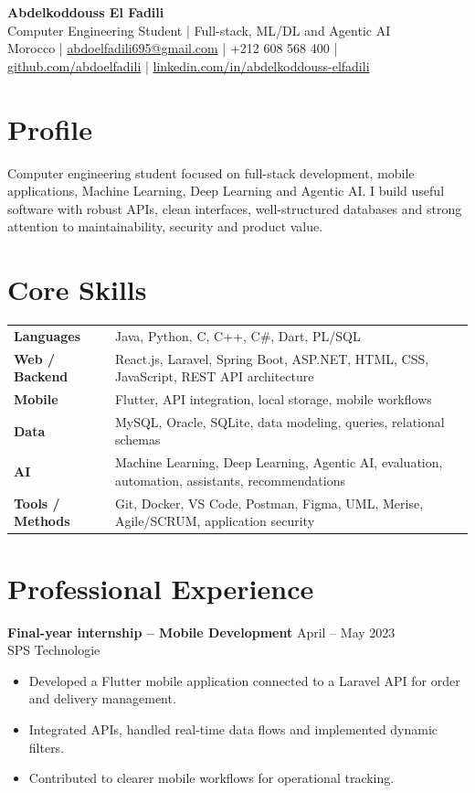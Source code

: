\documentclass[10pt,a4paper]{article}
\newcommand{\entry}[4]{
  \textbf{#1} \hfill {\small\color{muted} #2}\\
  {\color{accent}#3}\\[-2pt]
  #4
}
\begin{document}
{\Huge\bfseries Abdelkoddouss El Fadili}\\[3pt]
{\large Computer Engineering Student | Full-stack, ML/DL and Agentic AI}\\[6pt]
Morocco \quad | \quad
\href{mailto:abdoelfadili695@gmail.com}{abdoelfadili695@gmail.com} \quad | \quad
+212 608 568 400 \quad | \quad
\href{https://github.com/abdoelfadili}{github.com/abdoelfadili} \quad | \quad
\href{https://www.linkedin.com/in/abdelkoddouss-elfadili/}{linkedin.com/in/abdelkoddouss-elfadili}

\section*{Profile}
Computer engineering student focused on full-stack development, mobile applications, Machine Learning, Deep Learning and Agentic AI. I build useful software with robust APIs, clean interfaces, well-structured databases and strong attention to maintainability, security and product value.

\section*{Core Skills}
\begin{tabularx}{\textwidth}{>{\bfseries}p{3.2cm} X}
Languages & Java, Python, C, C++, C\#, Dart, PL/SQL \\
Web / Backend & React.js, Laravel, Spring Boot, ASP.NET, HTML, CSS, JavaScript, REST API architecture \\
Mobile & Flutter, API integration, local storage, mobile workflows \\
Data & MySQL, Oracle, SQLite, data modeling, queries, relational schemas \\
AI & Machine Learning, Deep Learning, Agentic AI, evaluation, automation, assistants, recommendations \\
Tools / Methods & Git, Docker, VS Code, Postman, Figma, UML, Merise, Agile/SCRUM, application security \\
\end{tabularx}

\section*{Professional Experience}
\entry{Final-year internship -- Mobile Development}{April -- May 2023}{SPS Technologie}{
\begin{itemize}
  \item Developed a Flutter mobile application connected to a Laravel API for order and delivery management.
  \item Integrated APIs, handled real-time data flows and implemented dynamic filters.
  \item Contributed to clearer mobile workflows for operational tracking.
\end{itemize}
}
\end{document}
